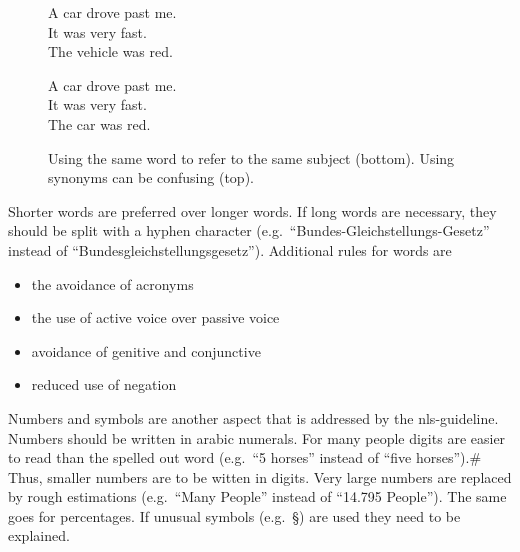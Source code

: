 \begin{figure}[htb]
    \begin{center}
        \colorbox{badred!20}{
            \begin{minipage}{0.6\textwidth}
                A car drove past me.\\
                It was very fast.\\
                The vehicle was red.
            \end{minipage}
        }
        \colorbox{goodgreen!20}{
            \begin{minipage}{0.6\textwidth}
                A car drove past me.\\
                It was very fast.\\
                The car was red.
            \end{minipage}
        }
    \end{center}
    \caption[Using the same word to refer to the same subject.]{Using the same word to refer to the same subject (bottom). Using synonyms can be confusing (top).}
    \label{fig:subject_ref}
\end{figure}
Shorter words are preferred over longer words.
If long words are necessary, they should be split with a hyphen character (e.g.\ \enquote{Bundes-Gleichstellungs-Gesetz} instead of \enquote{Bundesgleichstellungsgesetz}).
Additional rules for words are
\begin{itemize}[noitemsep]
    \item the avoidance of acronyms
    \item the use of active voice over passive voice
    \item avoidance of genitive and conjunctive
    \item reduced use of negation
\end{itemize}
Numbers and symbols are another aspect that is addressed by the \gls{nls}-guideline.
Numbers should be written in arabic numerals.
For many people digits are easier to read than the spelled out word (e.g.\ \enquote{5 horses} instead of \enquote{five horses}).#
Thus, smaller numbers are to be witten in digits.
Very large numbers are replaced by rough estimations (e.g.\ \enquote{Many People} instead of \enquote{14.795 People}).
The same goes for percentages.
If unusual symbols (e.g.\ §) are used they need to be explained.

